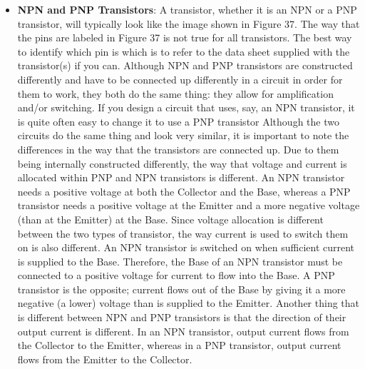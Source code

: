 \documentclass{report}
\begin{document}
\begin{itemize}
            \begin{enumerate}
                \item PNP transistors
                \item NPN transistors
            \end{enumerate}
            \bigbreak \noindent 
        \item \textbf{NPN and PNP Transistors}: A transistor, whether it is an NPN or a PNP transistor, will typically look like the image shown in Figure 37.
            \bigbreak \noindent 
            \bigbreak \noindent 
            The way that the pins are labeled in Figure 37 is not true for all transistors. The best way to identify which pin is which is to refer to the data sheet supplied with the transistor(s) if you can.
            \bigbreak \noindent 
            Although NPN and PNP transistors are constructed differently and have to be connected up differently in a circuit in order for them to work, they both do the same thing: they allow for amplification and/or switching. If you design a circuit that uses, say, an NPN transistor, it is quite often easy to change it to use a PNP transistor
            \bigbreak \noindent 
            \bigbreak \noindent 
            Although the two circuits do the same thing and look very similar, it is important to note the differences in the way that the transistors are connected up.
            \bigbreak \noindent 
            Due to them being internally constructed differently, the way that voltage and current is allocated within PNP and NPN transistors is different. An NPN transistor needs a positive voltage at both the Collector and the Base, whereas a PNP transistor needs a positive voltage at the Emitter and a more negative voltage (than at the Emitter) at the Base.
            \bigbreak \noindent 
            Since voltage allocation is different between the two types of transistor, the way current is used to switch them on is also different. An NPN transistor is switched on when sufficient current is supplied to the Base. Therefore, the Base of an NPN transistor must be connected to a positive voltage for current to flow into the Base. A PNP transistor is the opposite; current flows out of the Base by giving it a more negative (a lower) voltage than is supplied to the Emitter.
            \bigbreak \noindent 
            Another thing that is different between NPN and PNP transistors is that the direction of their output current is different. In an NPN transistor, output current flows from the Collector to the Emitter, whereas in a PNP transistor, output current flows from the Emitter to the Collector.

\end{itemize}
\end{document}
